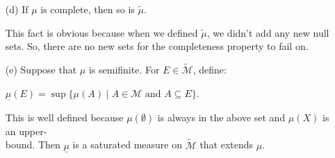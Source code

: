\documentclass{book}
\newcommand{\exTwoP}{%
   \color{RedViolet}%
   \fontsize{13}{15}\selectfont%
}
\newenvironment{myIndent}{%
   \begin{adjustwidth}{2.5em}{0em}%
}{%
   \end{adjustwidth}%
}
\newcommand{\retTwo}{\hfill\bigbreak}
\begin{document}
\begin{enumerate}
   \begin{myIndent}\exTwoP
      Since $\emptyset \in \mathcal{M}$, we know $\widetilde{\mu}(\emptyset) = \mu(\emptyset) = 0$.\newpage 

      Note that if $A, B \in \widetilde{\mathcal{M}}$ with $A \subseteq B$ and $A \notin \mathcal{M}$ but $B \in \mathcal{M}$, then we\\ immediately get a contradiction since that would suggest $A = A \cap B \in \mathcal{M}$. As a result, supposing $(E_j)_{j \in \mathbb{N}}$ is a sequence of disjoint sets in $\widetilde{\mathcal{M}}$, we have that if any $E_j \notin \mathcal{M}$, then:\\ [-22pt]
      
      {\centering$\widetilde{\mu}(\bigcup\limits_{j \in \mathbb{N}}E_j) = \infty = \sum\limits_{j =1}^\infty \widetilde{\mu}(E_j)$.\retTwo\par}

      Meanwhile, if all sets of $(E_j)_{j \in \mathbb{N}}$ are in $\mathcal{M}$, then:\\ [-16pt]

      {\centering$\widetilde{\mu}(\bigcup\limits_{j \in \mathbb{N}}E_j) = \mu(\bigcup\limits_{j \in \mathbb{N}}E_j) = \sum\limits_{j =1}^\infty \mu(E_j) = \sum\limits_{j =1}^\infty \widetilde{\mu}(E_j)$.\retTwo\par}
   \end{myIndent}

   \item[(d)] If $\mu$ is complete, then so is $\widetilde{\mu}$.
   
   \begin{myIndent}\exTwoP
      This fact is obvious because when we defined $\widetilde{\mu}$, we didn't add any new null sets. So, there are no new sets for the completeness property to fail on.
   \end{myIndent}

   \item[(e)] Suppose that $\mu$ is semifinite. For $E \in \widetilde{\mathcal{M}}$, define:
   
   {\centering $\underline{\mu}(E) = \sup \{\mu(A) \mid A \in \mathcal{M} \text{ and } A \subseteq E \}$.\par}

   This is well defined because $\mu(\emptyset)$ is always in the above set and $\mu(X)$ is an upper-\\bound. Then $\underline{\mu}$ is a saturated measure on $\widetilde{\mathcal{M}}$ that extends $\mu$.\\ [-16pt]


\end{enumerate}
\end{document}
